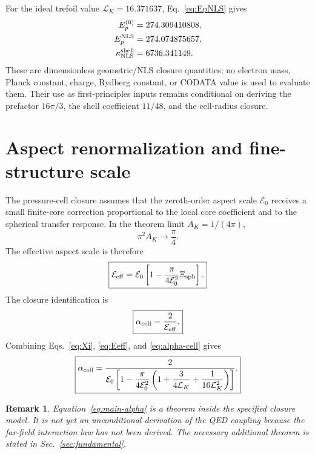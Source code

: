 \documentclass[11pt]{article}
\newcommand{\LK}{\mathcal L_K}
\newcommand{\Ezero}{\mathcal E_0}
\newcommand{\Eeff}{\mathcal E_{\rm eff}}
\newcommand{\Xisph}{\Xi_{\rm sph}}
\newcommand{\alphacell}{\alpha_{\rm cell}}
\newcommand{\EpNLS}{E_p^{\rm NLS}}
\newcommand{\kappaNLS}{\kappa_{\rm NLS}^{\rm shell}}
\newtheorem{remark}{Remark}
\begin{document}
For the ideal trefoil value \(\mathcal L_K=16.371637\), Eq.~\eqref{eq:EpNLS} gives
\begin{align}
  E_p^{(0)} &= 274.309410808,\\
  \EpNLS &= 274.074875657,\\
  \kappaNLS &= 6736.341149.
\end{align}
These are dimensionless geometric/NLS closure quantities; no electron mass, Planck constant, charge,
Rydberg constant, or CODATA value is used to evaluate them.  Their use as first-principles inputs remains conditional on deriving the prefactor \(16\pi/3\), the shell coefficient \(11/48\), and the cell-radius closure.

\section{Aspect renormalization and fine-structure scale}
\label{sec:aspect}

The pressure-cell closure assumes that the zeroth-order aspect scale \(\Ezero\) receives a
small finite-core correction proportional to the local core coefficient and to the spherical
transfer response.  In the theorem limit \(A_K=1/(4\pi)\),
\begin{equation}
  \pi^2 A_K\to\frac{\pi}{4}.
\end{equation}
The effective aspect scale is therefore
\begin{equation}
  \boxed{
  \Eeff
  =
  \Ezero
  \left[
  1-
  \frac{\pi}{4\Ezero^2}\Xisph
  \right].
  }
  \label{eq:Eeff}
\end{equation}
The closure identification is
\begin{equation}
  \boxed{
  \alphacell=\frac{2}{\Eeff}.
  }
  \label{eq:alpha-cell}
\end{equation}
Combining Eqs.~\eqref{eq:Xi}, \eqref{eq:Eeff}, and \eqref{eq:alpha-cell} gives
\begin{equation}
  \boxed{
  \alphacell
  =
  \frac{2}{
  \Ezero
  \left[
  1-\dfrac{\pi}{4\Ezero^2}
  \left(
  1+\dfrac{3}{4\LK}+\dfrac{1}{16\LK^2}
  \right)
  \right]
  }.
  }
  \label{eq:main-alpha}
\end{equation}

\begin{remark}
Equation~\eqref{eq:main-alpha} is a theorem inside the specified closure model.  It is not yet
an unconditional derivation of the QED coupling because the far-field interaction law has not
been derived.  The necessary additional theorem is stated in Sec.~\ref{sec:fundamental}.
\end{remark}
\end{document}
